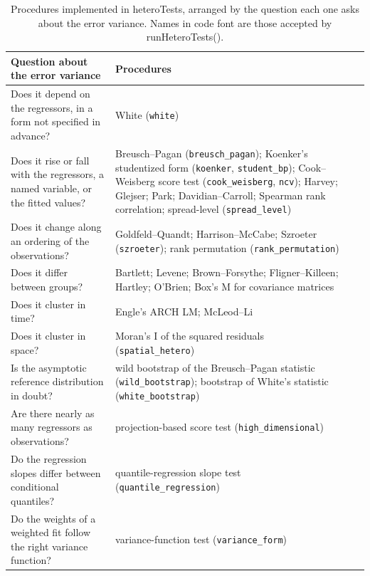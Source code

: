 \begin{table}[!t]

\caption{\label{tab:procedures}Procedures implemented in heteroTests, arranged by the question each one asks about the error variance. Names in code font are those accepted by runHeteroTests().}
\centering
\begin{tabular}[t]{>{\raggedright\arraybackslash}p{4.4cm}>{\raggedright\arraybackslash}p{8.4cm}>{\raggedright\arraybackslash}p{4.4cm}>{\raggedright\arraybackslash}p{8.4cm}}
\toprule
Question about the error variance & Procedures\\
\midrule
Does it depend on the regressors, in a form not specified in advance? & White (\texttt{white})\\
\addlinespace
Does it rise or fall with the regressors, a named variable, or the fitted values? & Breusch--Pagan (\texttt{breusch\_pagan}); Koenker's studentized form (\texttt{koenker}, \texttt{student\_bp}); Cook--Weisberg score test (\texttt{cook\_weisberg}, \texttt{ncv}); Harvey; Glejser; Park; Davidian--Carroll; Spearman rank correlation; spread-level (\texttt{spread\_level})\\
\addlinespace
Does it change along an ordering of the observations? & Goldfeld--Quandt; Harrison--McCabe; Szroeter (\texttt{szroeter}); rank permutation (\texttt{rank\_permutation})\\
\addlinespace
Does it differ between groups? & Bartlett; Levene; Brown--Forsythe; Fligner--Killeen; Hartley; O'Brien; Box's M for covariance matrices\\
\addlinespace
Does it cluster in time? & Engle's ARCH LM; McLeod--Li\\
\addlinespace
Does it cluster in space? & Moran's I of the squared residuals (\texttt{spatial\_hetero})\\
\addlinespace
Is the asymptotic reference distribution in doubt? & wild bootstrap of the Breusch--Pagan statistic (\texttt{wild\_bootstrap}); bootstrap of White's statistic (\texttt{white\_bootstrap})\\
\addlinespace
Are there nearly as many regressors as observations? & projection-based score test (\texttt{high\_dimensional})\\
\addlinespace
Do the regression slopes differ between conditional quantiles? & quantile-regression slope test (\texttt{quantile\_regression})\\
\addlinespace
Do the weights of a weighted fit follow the right variance function? & variance-function test (\texttt{variance\_form})\\
\bottomrule
\end{tabular}
\end{table}


